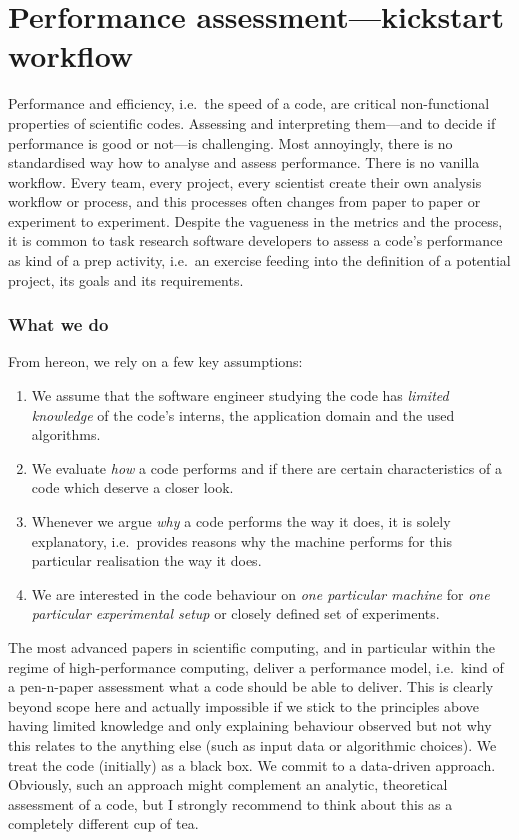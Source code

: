 \chapter{Performance assessment---kickstart workflow}
\label{chapter:performance-assessment}

Performance and efficiency, i.e.~the speed of a code, are critical non-functional properties of scientific codes.
Assessing and interpreting them---and to decide if performance is good or not---is challenging.
Most annoyingly, there is no standardised way how to analyse and assess performance.
There is no vanilla workflow.
Every team, every project, every scientist create their own analysis workflow or
process, and this processes often changes from paper to paper or experiment to experiment.
Despite the vagueness in the metrics and the process, it is common to task research software developers to assess a code's performance as kind of a prep activity, i.e.~an exercise feeding into
the definition of a potential project, its goals and its requirements.



\subsection*{What we do}

From hereon, we rely on a few key assumptions:

\begin{enumerate}
  \item We assume that the software engineer studying the code has \emph{limited knowledge} of the code's interns, the application domain and the used algorithms. 
  \item We evaluate \emph{how} a code performs and if there are certain characteristics of a code which deserve a closer look.
  \item Whenever we argue \emph{why} a code performs the way it does, it is solely explanatory, i.e.~provides reasons why the machine performs for this particular realisation the way it does.
  \item We are interested in the code behaviour on \emph{one particular machine} for \emph{one particular experimental setup} or closely defined set of experiments.
\end{enumerate}


\noindent
The most advanced papers in scientific computing, and in particular within the regime of high-performance computing, deliver a performance model, i.e.~kind of a pen-n-paper assessment what a code should be able to deliver.
This is clearly beyond scope here and actually impossible if we stick to the principles above having limited knowledge and only explaining behaviour observed but not why this relates to the anything else (such as input data or algorithmic choices).
We treat the code (initially) as a black box.
We commit to a data-driven approach.
Obviously, such an approach might complement an analytic, theoretical assessment of a code, but I strongly recommend to think about this as a completely different cup of tea.


